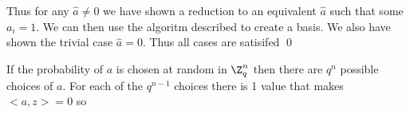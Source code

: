 \documentclass[12pt]{amsart}
\begin{document}
\begin{problem}
\begin{subproblem}
      Thus for any $\hat a \neq 0$ we have shown a reduction to an equivalent $\hat a$ such that some $a_i = 1$. We can then use the algoritm described to create a basis. We also have shown the trivial case $\hat a=0$. Thus all cases are satisifed \qed 
    \end{subproblem}
    \begin{subproblem}
      If the probability of $a$ is chosen at random in $\Z_q^n$ then there are $q^n$ possible choices of $a$. For each of the $q^{n-1}$ choices there is 1 value that makes $<a,z>=0$ so 

    \end{subproblem}
  \begin{subproblem}
    
  \end{subproblem}
  \end{problem}
\end{document}
